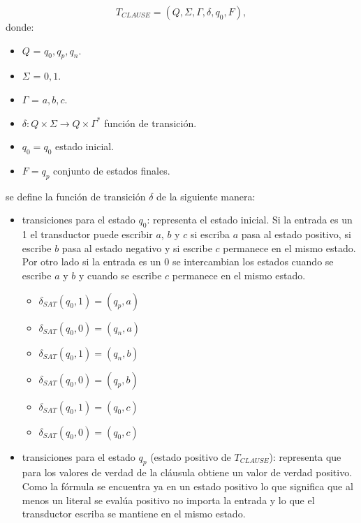\documentclass[12pt]{article}
\begin{document}
\[
    T_{CLAUSE} = (Q, {\Sigma}, \Gamma, \delta, q_{0}, F),
\]
donde:
\begin{itemize}
    \item \(Q\) = ${q_0,q_p,q_n}$.
    \item \(\Sigma\) = ${0,1}$.
    \item \(\Gamma\) = ${a,b,c}$.
    \item \(\delta: Q \times \Sigma \to Q \times \Gamma^*\) función de transición.
    \item \(q_{0} = q_0\) estado inicial.
    \item \(F={q_p}\) conjunto de estados finales.
\end{itemize}
se define la función de transición $\delta$ de la siguiente manera:

\begin{itemize}
    \item  transiciones para el estado $q_0$: representa el estado inicial. Si la entrada es un 1 el transductor
          puede escribir $a$, $b$ y $c$ si escriba $a$ pasa al estado positivo, si escribe $b$ pasa al estado negativo
          y si escribe $c$ permanece en el mismo estado. Por otro lado si la entrada es un 0 se intercambian los estados 
          cuando se escribe $a$ y $b$ y cuando se escribe $c$ permanece en el mismo estado.
          
          \begin{multicols}{2}
              \begin{itemize}
                  \item $\delta_{SAT}(q_0,1)=(q_p,a)$
                  \item $\delta_{SAT}(q_0,0)=(q_n,a)$
                  \item $\delta_{SAT}(q_0,1)=(q_n,b)$
                  \item $\delta_{SAT}(q_0,0)=(q_p,b)$
                  \item $\delta_{SAT}(q_0,1)=(q_0,c)$
                  \item $\delta_{SAT}(q_0,0)=(q_0,c)$
              \end{itemize}
          \end{multicols}
          
    \item  transiciones para el estado $q_p$ (estado positivo de $T_{CLAUSE}$): representa que para los valores de verdad de la cláusula obtiene un valor de verdad positivo.
          Como la fórmula se encuentra ya en un estado positivo lo que significa que al menos un literal se evalúa positivo no importa
          la entrada y lo que el transductor escriba se mantiene en el mismo estado.      
          

\end{itemize}
\end{document}
